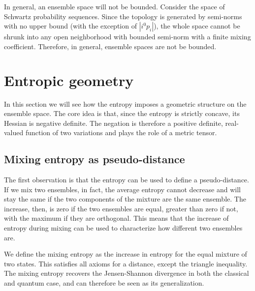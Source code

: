 In general, an ensemble space will not be bounded. Consider the space of Schwartz probability sequences. Since the topology is generated by semi-norms with no upper bound (with the exception of $|i^0 p_i|$), the whole space cannot be shrunk into any open neighborhood with bounded semi-norm with a finite mixing coefficient. Therefore, in general, ensemble spaces are not be bounded.

\section{Entropic geometry}

In this section we will see how the entropy imposes a geometric structure on the ensemble space. The core idea is that, since the entropy is strictly concave, its Hessian is negative definite. The negation is therefore a positive definite, real-valued function of two variations and plays the role of a metric tensor.

\subsection{Mixing entropy as pseudo-distance}

The first observation is that the entropy can be used to define a pseudo-distance. If we mix two ensembles, in fact, the average entropy cannot decrease and will stay the same if the two components of the mixture are the same ensemble. The increase, then, is zero if the two ensembles are equal, greater than zero if not, with the maximum if they are orthogonal. This means that the increase of entropy during mixing can be used to characterize how different two ensembles are.

We define the mixing entropy as the increase in entropy for the equal mixture of two states. This satisfies all axioms for a distance, except the triangle inequality. The mixing entropy recovers the Jensen-Shannon divergence in both the classical and quantum case, and can therefore be seen as its generalization.

